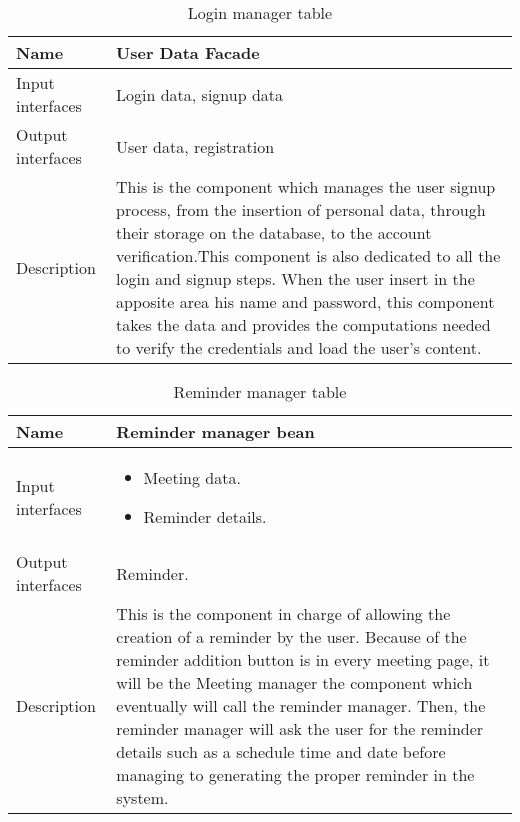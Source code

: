 \begin{flushleft}
	
	\begin{table}[htp]
		
		\begin{tabular}{l|p{7cm}}
			
		
		
			Name&\textbf{User Data Facade}\\
			\hline
			\hline
			Input interfaces& Login data, signup data \\
			\hline
			Output interfaces& User data, registration \\
			\hline
			Description&This is the component which manages the user signup process, from the insertion of personal data, through their storage on the database, to the account verification.This component is also dedicated to all the login and signup steps. When the user insert in the apposite area his name and password, this component takes the data and provides the computations needed to verify the credentials and load the user's content. \\
			\hline
			
		\end{tabular}
		
		\caption{Login manager table } 
		\label{tab:loginmanagertable}
		
	\end{table}
	
\end{flushleft}

\begin{flushleft}
	
	\begin{table}[htp]
		
		\begin{tabular}{l|p{7cm}}
		
			Name&\textbf{Reminder manager bean}\\
			\hline
			\hline
			Input interfaces& \begin{itemize} 
				\item Meeting data.
				\item Reminder details.
			\end{itemize} 
			\\
			\hline
			Output interfaces& Reminder. \\
			\hline
			Description&This is the component in charge of allowing the creation of a reminder by the user. Because of the reminder addition button is in every meeting page, it will be the Meeting manager the component which eventually will call the reminder manager. Then, the reminder manager will ask the user for the reminder details such as a schedule time and date before managing to generating the proper reminder in the system. \\
			\hline
			
		\end{tabular}
		
		\caption{Reminder manager table } 
		\label{tab:remindermanagertable}
		
	\end{table}
	
\end{flushleft}

